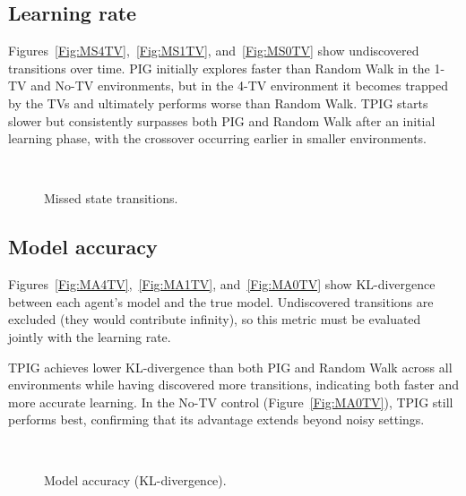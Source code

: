 \documentclass[letterpaper]{article}
\begin{document}
\subsection{Learning rate}

Figures~\ref{Fig:MS4TV},~\ref{Fig:MS1TV}, and~\ref{Fig:MS0TV} show
undiscovered transitions over time.  PIG initially explores faster
than Random Walk in the 1-TV and No-TV environments, but in the
4-TV environment it becomes trapped by the TVs and ultimately performs
worse than Random Walk.  TPIG starts slower but consistently surpasses
both PIG and Random Walk after an initial learning phase, with the
crossover occurring earlier in smaller environments.

\newsavebox{\MSfourTV}\newsavebox{\MSoneTV}\newsavebox{\MSnoTV}
\sbox{\MSfourTV}{}
\sbox{\MSoneTV}{}
\sbox{\MSnoTV}{}
\begin{figure}
  \centering
  \hfill
  \\[4pt]
  \caption{Missed state transitions.}
  \label{Fig:MS}
\end{figure}

\subsection{Model accuracy}

Figures~\ref{Fig:MA4TV},~\ref{Fig:MA1TV}, and~\ref{Fig:MA0TV} show
KL-divergence between each agent's model and the true model.
Undiscovered transitions are excluded (they would contribute infinity),
so this metric must be evaluated jointly with the learning rate.

TPIG achieves lower KL-divergence than both PIG and Random Walk
across all environments while having discovered more transitions,
indicating both faster and more accurate learning.  In the No-TV
control (Figure~\ref{Fig:MA0TV}), TPIG still performs best, confirming
that its advantage extends beyond noisy settings.

\newsavebox{\MAfourTV}\newsavebox{\MAoneTV}\newsavebox{\MAnoTV}
\sbox{\MAfourTV}{}
\sbox{\MAoneTV}{}
\sbox{\MAnoTV}{}
\begin{figure}
  \centering
  \hfill
  \\[4pt]
  \caption{Model accuracy (KL-divergence).}
  \label{Fig:MA}
\end{figure}
\end{document}
